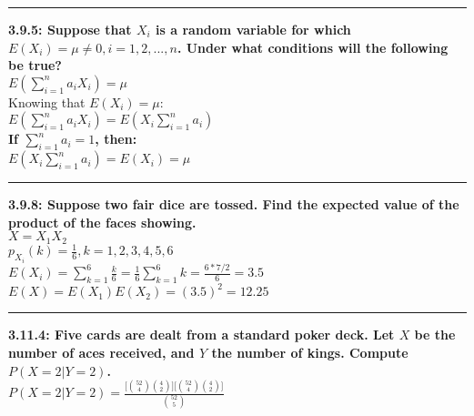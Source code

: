 \documentclass[11pt]{article}
\newcommand\question[2]{\vspace{.25in}\hrule\textbf{#1: #2}\vspace{.5em}\vspace{.10in}}
\renewcommand\part[1]{\vspace{.10in}\textbf{(#1)}}
\begin{document}
\question{3.9.5}
{Suppose that $X_{i}$ is a random variable for which 
$E(X_{i}) = \mu \neq 0,i=1,2,...,n$. Under what conditions will the following
be true?\\
$E(\sum_{i=1}^{n} a_{i} X_{i}) = \mu$}
\\
Knowing that $E(X_{i})=\mu$:
\\
$
E(\sum_{i=1}^{n}a_iX_{i})
=
E(X_{i}\sum_{i=1}^{n}a_i)
$
\\
\bf{If $\sum_{i=1}^{n}a_i=1$, then:}
\\
$
E(X_{i}\sum_{i=1}^{n}a_i)
=
E(X_{i})
=
\mu
$



\question{3.9.8}
{Suppose two fair dice are tossed. Find the expected value of the product of the
faces showing.}
\\
$X=X_{1}X_{2}$
\\
$p_{X_{i}}(k)=\frac{1}{6} ,k=1,2,3,4,5,6$
\\
$E(X_{i}) 
= 
\sum_{k=1}^{6}\frac{k}{6}
=
\frac{1}{6}\sum_{k=1}^{6}k
= 
\frac{6*7/2}{6}
=
3.5
$
\\
$E(X)=E(X_{1})E(X_{2})=(3.5)^{2}=12.25$



\question{3.11.4}
{Five cards are dealt from a standard poker deck. Let $X$ be the number of aces
received, and $Y$ the number of kings. Compute $P(X = 2|Y=2)$.}
\\
$
P(X = 2|Y=2)=\frac{\big[\binom{52}{4}\binom{4}{2}\big]\big[\binom{52}{4}\binom{4}{2}\big]}{\binom{52}{5}}
$


% 
\end{document}

